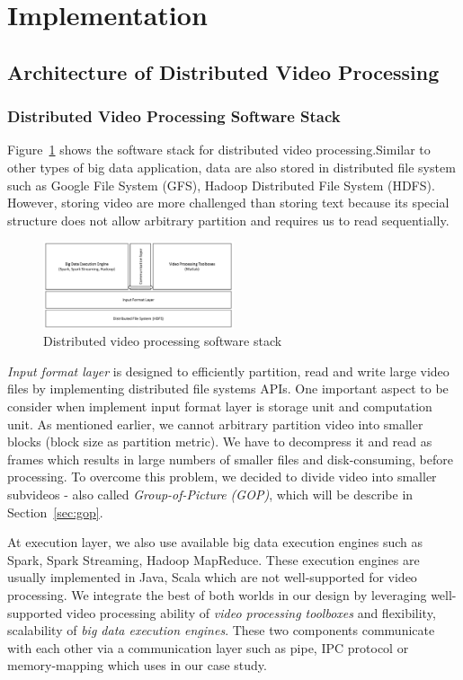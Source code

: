 \section{Implementation}
\label{sec:sec_algorithm}
\subsection{Architecture of Distributed Video Processing}

\subsubsection{Distributed Video Processing Software Stack}
Figure~\ref{fig:stack} shows the software stack for distributed video
processing.Similar to other types of big data application, data are also stored
in distributed file system such as Google File System (GFS)\cite{gfs}, Hadoop
Distributed File System (HDFS)\cite{hdfs}. However, storing video are more
challenged than storing text because its special structure does not allow
arbitrary partition and requires us to read sequentially.
\begin{figure}[htbp!]\centering
\vspace{-1ex}
\includegraphics[width=0.5\textwidth]{figures/softwarestack.pdf}
\vspace{-4ex}
\caption{Distributed video processing software stack}
\label{fig:stack}
\end{figure}
 \textit{Input format
layer} is designed to efficiently partition, read and write large video files by
implementing distributed file systems APIs. One important aspect to be consider
when implement input format layer is storage unit and computation unit. As
mentioned earlier, we cannot arbitrary partition video into smaller blocks
(block size as partition metric). We have to decompress it and read as frames
which results in large numbers of smaller files and disk-consuming, before
processing. To overcome this problem, we decided to divide video into smaller
subvideos - also called \textit{Group-of-Picture (GOP)}, which will be describe
in Section~\ref{sec:gop}. 

At execution layer, we also use available big data execution engines such as
Spark\cite{spark}, Spark Streaming\cite{sparkstreaming}, Hadoop
MapReduce\cite{hadoop}. These execution engines are usually implemented in Java,
Scala which are not well-supported for video processing. We integrate the best
of both worlds in our design by leveraging well-supported video processing
ability of \textit{video processing toolboxes} and flexibility, scalability of
\textit{big data execution engines}. These two components communicate with each
other via a communication layer such as pipe, IPC protocol or memory-mapping which uses in our case study.

